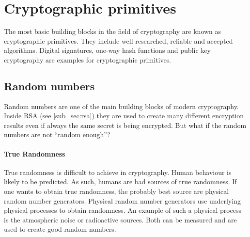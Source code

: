 \section{Cryptographic primitives}

The most basic building blocks in the field of cryptography are known as
cryptographic primitives. They include well researched, reliable and accepted
algorithms. Digital signatures, one-way hash functions and public key
cryptography are examples for cryptographic primitives.

\subsection{Random numbers}

Random numbers are one of the main building blocks of modern cryptography.
Inside RSA (see \ref{sub_sec:rsa}) they are used to create many different encryption results even
if always the same secret is being encrypted. But what if the random numbers
are not ``random enough''?

\paragraph{True Randomness}
True randomness is difficult to achieve in cryptography. Human behaviour
is likely to be predicted. As such, humans are bad sources of true randomness.
If one wants to obtain true randomness, the probably best source are physical
random number generators. Physical random number generators use underlying
physical processes to obtain randomness. An example of such a physical process
is the atmospheric noise or radioactive sources. Both can be measured and
are used to create good random numbers.

